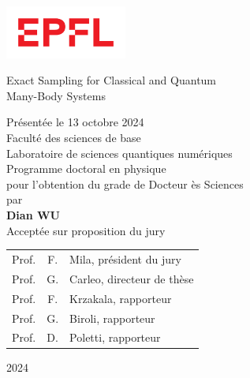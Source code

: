 
\begin{titlepage}
\begin{otherlanguage}{french}

\sffamily

\begin{flushleft}
\parbox{0.3\textwidth}{\includegraphics[width=4cm]{images/epfl}}
\end{flushleft}

\begin{flushright}
\phantom{Thèse n.~TODO}
\end{flushright}

\null\vspace{2cm}

\begin{minipage}{4cm}
\end{minipage}
\hfill
\begin{minipage}{11cm}
{\Large Exact Sampling for Classical and Quantum \\[8pt] Many-Body Systems} \\

\vspace{2cm}

\small
Présentée le 13 octobre 2024 \\[8pt]
Faculté des sciences de base \\
Laboratoire de sciences quantiques numériques \\
Programme doctoral en physique \\

pour l'obtention du grade de Docteur ès Sciences \\[8pt]
par \\ [12pt]
{\Large \textbf{Dian WU}} \\[9pt]

Acceptée sur proposition du jury \\[5pt]
\setlength{\tabcolsep}{1.5pt}
\begin{tabular}{@{}lcl}
Prof. & F. & Mila, président du jury \\
Prof. & G. & Carleo, directeur de thèse \\
Prof. & F. & Krzakala, rapporteur \\
Prof. & G. & Biroli, rapporteur \\
Prof. & D. & Poletti, rapporteur \\
\end{tabular}
\end{minipage}
\vspace{2.33cm}
\begin{flushright}
2024
\end{flushright}

\end{otherlanguage}
\end{titlepage}
